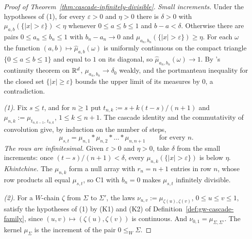 \begin{proof}[Proof of Theorem~\ref{thm:cascade-infinitely-divisible}]
\emph{Small increments.} Under the hypotheses of (1), for every $\varepsilon > 0$ and $\eta > 0$
there is $\delta > 0$ with $\mu_{a,b}(\{|x| > \varepsilon\}) < \eta$ whenever $0 \le a \le b \le 1$
and $b - a < \delta$. Otherwise there are pairs $0 \le a_n \le b_n \le 1$ with $b_n - a_n \to 0$ and
$\mu_{a_n,b_n}(\{|x| > \varepsilon\}) \ge \eta$. For each $\omega$ the function
$(a,b) \mapsto \widehat\mu_{a,b}(\omega)$ is uniformly continuous on the compact triangle
$\{0 \le a \le b \le 1\}$ and equal to $1$ on its diagonal, so $\widehat\mu_{a_n,b_n}(\omega) \to 1$.
By \Levy's continuity theorem on $\mathbb{R}^d$, $\mu_{a_n,b_n} \to \delta_0$ weakly, and the portmanteau inequality for
the closed set $\{|x| \ge \varepsilon\}$ bounds the upper limit of its measures by $0$, a
contradiction.

\emph{(1).} Fix $s \le t$, and for $n \ge 1$ put $t_{n,k} := s + k(t - s)/(n+1)$ and
$\mu_{n,k} := \mu_{t_{n,k-1},\,t_{n,k}}$, $1 \le k \le n+1$. The cascade identity and the commutativity
of convolution give, by induction on the number of steps,
\[
  \mu_{s,t} = \mu_{n,1} * \mu_{n,2} * \dots * \mu_{n,n+1} \qquad \text{for every } n .
\]
\emph{The rows are infinitesimal.} Given $\varepsilon > 0$ and $\eta > 0$, take $\delta$ from the
small increments: once $(t - s)/(n+1) < \delta$, every $\mu_{n,k}(\{|x| > \varepsilon\})$ is below
$\eta$. \emph{Khintchine.} The $\mu_{n,k}$ form a null array with $r_n = n + 1$ entries in row $n$,
whose row products all equal $\mu_{s,t}$, so C1 with $b_n = 0$ makes $\mu_{s,t}$ infinitely
divisible.

\emph{(2).} For a $W$-chain $\zeta$ from $\Sigma$ to $\Sigma'$, the laws
$\nu_{u,v} := \mu_{\zeta(u),\zeta(v)}$, $0 \le u \le v \le 1$, satisfy the hypotheses of (1) by
(K1) and (K2) of Definition~\ref{def:gw-cascade-family}, since $(u,v) \mapsto (\zeta(u),\zeta(v))$
is continuous. And $\nu_{0,1} = \mu_{\Sigma,\Sigma'}$. The kernel $\mu_\Sigma$ is the increment of
the pair $0 \le_W \Sigma$.


\end{proof}
